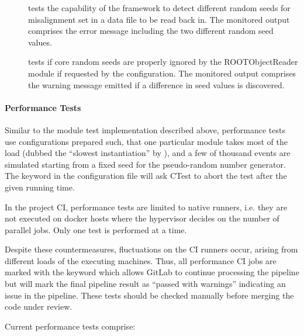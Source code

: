 \begin{description}
    \item[] tests the capability of the framework to detect different random seeds for misalignment set in a data file to be read back in. The monitored output comprises the error message including the two different random seed values.
    \item[] tests if core random seeds are properly ignored by the ROOTObjectReader module if requested by the configuration. The monitored output comprises the warning message emitted if a difference in seed values is discovered.
\end{description}

\paragraph{Performance Tests}

Similar to the module test implementation described above, performance tests use configurations prepared such, that one particular module takes most of the load (dubbed the ``slowest instantiation'' by \apsq), and a few of thousand events are simulated starting from a fixed seed for the pseudo-random number generator.
The  keyword in the configuration file will ask CTest to abort the test after the given running time.

In the project CI, performance tests are limited to native runners, i.e. they are not executed on docker hosts where the hypervisor decides on the number of parallel jobs.
Only one test is performed at a time.

Despite these countermeasures, fluctuations on the CI runners occur, arising from different loads of the executing machines.
Thus, all performance CI jobs are marked with the  keyword which allows GitLab to continue processing the pipeline but will mark the final pipeline result as ``passed with warnings'' indicating an issue in the pipeline.
These tests should be checked manually before merging the code under review.

Current performance tests comprise:

